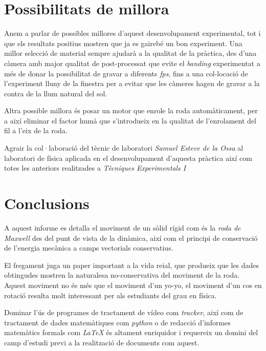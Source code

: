 \documentclass[11pt]{article}
\begin{document}
\clearpage    
\section{Possibilitats de millora}
    Anem a parlar de possibles millores d'aquest desenvolupament experimental, tot i que els resultats positius mostren que ja es gairebé un bon experiment. Una millor selecció de material sempre ajudarà a la qualitat de la pràctica, des d'una càmera amb major qualitat de post-processat que evite el \textit{banding} experimentat a més de donar la possibilitat de gravar a diferents \textit{fps}, fins a una col-locació de l'experiment lluny de la finestra per a evitar que les càmeres hagen de gravar a la contra de la llum natural del sol. 

    \vspace{0.4cm}Altra possible millora és posar un motor que enrole la roda automàticament, per a així eliminar el factor humà que s'introdueix en la qualitat de l'enrolament del fil a l'eix de la roda.

    \vspace{0.4cm}Agrair la col·laboració del tècnic de laboratori \textit{Samuel Esteve de la Ossa} al laboratori de física aplicada en el desenvolupament d'aquesta pràctica així com totes les anteriors realitzades a \textit{Tècniques Experimentals I}

    
\section{Conclusions}

    A aquest informe es detalla el moviment de un sòlid rígid com és la \textit{roda de Maxwell} des del punt de vista de la dinàmica, així com el principi de conservació de l'energia mecànica a camps vectorials conservatius.
    
    \vspace{0.35cm}El fregament juga un paper important a la vida reial, que produeix que les dades obtingudes mostren la naturalesa no-conservativa del moviment de la roda. Aquest moviment no és més que el moviment d'un yo-yo, el moviment d'un cos en rotació resulta molt interessant per als estudiants del grau en física.

    \vspace{0.35cm}Dominar l'ús de programes de tractament de vídeo com \textit{tracker}, així com de tractament de dades matemàtiques com \textit{python} o de redacció d'informes matemàtics formals com \textit{LaTeX} és altament enriquidor i requereix un domini del camp d'estudi previ a la realització de documents com aquest.
\end{document}
